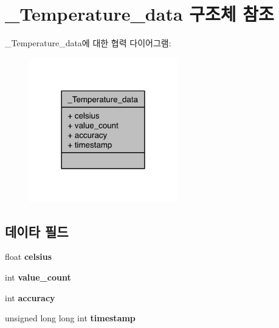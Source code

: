\hypertarget{struct___temperature__data}{\section{\-\_\-\-Temperature\-\_\-data 구조체 참조}
\label{struct___temperature__data}
}


\-\_\-\-Temperature\-\_\-data에 대한 협력 다이어그램\-:\nopagebreak
\begin{figure}[H]
\begin{center}
\leavevmode
\includegraphics[width=182pt]{df/d1f/struct___temperature__data__coll__graph}
\end{center}
\end{figure}
\subsection*{데이타 필드}
\begin{DoxyCompactItemize}
\item 
\hypertarget{struct___temperature__data_aadc6619595463c1d61980fc95cad3f53}{float {\bfseries celsius}}\label{struct___temperature__data_aadc6619595463c1d61980fc95cad3f53}

\item 
\hypertarget{struct___temperature__data_a40a079bfc72408819dc78da308203a74}{int {\bfseries value\-\_\-count}}\label{struct___temperature__data_a40a079bfc72408819dc78da308203a74}

\item 
\hypertarget{struct___temperature__data_a5565cf9073275f9713f9016e7c10d25f}{int {\bfseries accuracy}}\label{struct___temperature__data_a5565cf9073275f9713f9016e7c10d25f}

\item 
\hypertarget{struct___temperature__data_a8de02c4128636a7bf630ff5428f60c8d}{unsigned long long int {\bfseries timestamp}}\label{struct___temperature__data_a8de02c4128636a7bf630ff5428f60c8d}

\end{DoxyCompactItemize}


